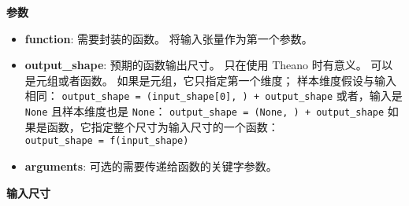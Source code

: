 \begin{Shaded}
\begin{Highlighting}[]

 
    \OperatorTok{-=} \OperatorTok{=}\OperatorTok{=}\NormalTok{)}
    \OperatorTok{=} \OperatorTok{=}\NormalTok{)}
    \OperatorTok{=} 
    \OperatorTok{=} \OperatorTok{-}
     \OperatorTok{=}\NormalTok{)}

 
    \OperatorTok{=} 
     \OperatorTok{==}   
    \NormalTok{shape[}\OperatorTok{-}\NormalTok{] }\OperatorTok{*=} 
     

                 \OperatorTok{=}
\end{Highlighting}
\end{Shaded}

\textbf{参数}

\begin{itemize}
\tightlist
\item
  \textbf{function}: 需要封装的函数。 将输入张量作为第一个参数。
\item
  \textbf{output\_shape}: 预期的函数输出尺寸。 只在使用 Theano
  时有意义。 可以是元组或者函数。 如果是元组，它只指定第一个维度；
  样本维度假设与输入相同：
  \texttt{output\_shape\ =\ (input\_shape{[}0{]},\ )\ +\ output\_shape}
  或者，输入是 \texttt{None} 且样本维度也是 \texttt{None}：
  \texttt{output\_shape\ =\ (None,\ )\ +\ output\_shape}
  如果是函数，它指定整个尺寸为输入尺寸的一个函数：
  \texttt{output\_shape\ =\ f(input\_shape)}
\item
  \textbf{arguments}: 可选的需要传递给函数的关键字参数。
\end{itemize}

\textbf{输入尺寸}

